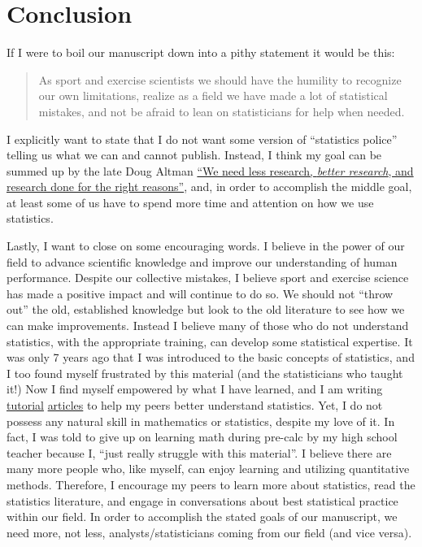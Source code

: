 \documentclass[
]{article}
\begin{document}
\hypertarget{conclusion}{%
\section{Conclusion}\label{conclusion}}

If I were to boil our manuscript down into a pithy statement it would be
this:

\begin{quote}
As sport and exercise scientists we should have the humility to
recognize our own limitations, realize as a field we have made a lot of
statistical mistakes, and not be afraid to lean on statisticians for
help when needed.
\end{quote}

I explicitly want to state that I do not want some version of
``statistics police'' telling us what we can and cannot publish.
Instead, I think my goal can be summed up by the late Doug Altman
\href{https://www.cochranelibrary.com/cdsr/doi/10.1002/14651858.ED000127/full}{``We
need less research, \emph{better research}, and research done for the
right reasons''}, and, in order to accomplish the middle goal, at least
some of us have to spend more time and attention on how we use
statistics.

Lastly, I want to close on some encouraging words. I believe in the
power of our field to advance scientific knowledge and improve our
understanding of human performance. Despite our collective mistakes, I
believe sport and exercise science has made a positive impact and will
continue to do so. We should not ``throw out'' the old, established
knowledge but look to the old literature to see how we can make
improvements. Instead I believe many of those who do not understand
statistics, with the appropriate training, can develop some statistical
expertise. It was only 7 years ago that I was introduced to the basic
concepts of statistics, and I too found myself frustrated by this
material (and the statisticians who taught it!) Now I find myself
empowered by what I have learned, and I am writing
\href{https://www.tandfonline.com/doi/full/10.1080/23328940.2019.1624131}{tutorial}
\href{https://osf.io/preprints/sportrxiv/tfx95/}{articles} to help my
peers better understand statistics. Yet, I do not possess any natural
skill in mathematics or statistics, despite my love of it. In fact, I
was told to give up on learning math during pre-calc by my high school
teacher because I, ``just really struggle with this material''. I
believe there are many more people who, like myself, can enjoy learning
and utilizing quantitative methods. Therefore, I encourage my peers to
learn more about statistics, read the statistics literature, and engage
in conversations about best statistical practice within our field. In
order to accomplish the stated goals of our manuscript, we need more,
not less, analysts/statisticians coming from our field (and vice versa).
\end{document}
